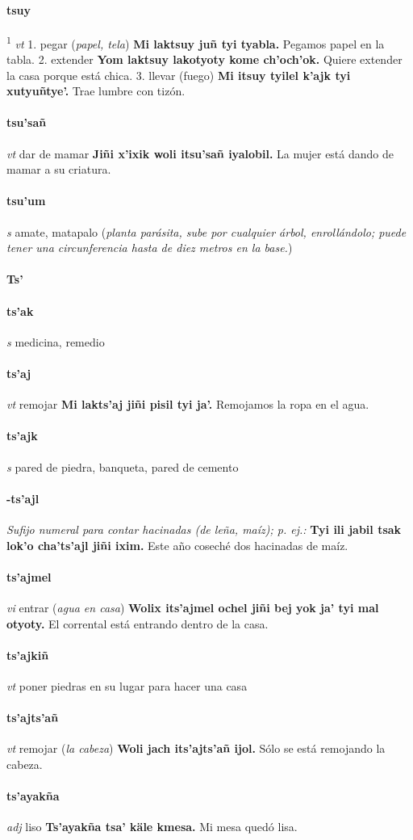 \documentclass{scrbook}
\newcommand{\entry}[1]{\paragraph{#1}}
\newcommand{\alphaletter}[1]{\addsec{#1}}
\newcommand{\onedefinition}[1]{#1.}
\newcommand{\defsuperscript}[1]{\textsuperscript{1}}
\newcommand{\nontranslationdef}[1]{\textit{#1}}
\newcommand{\partofspeech}[1]{\textit{#1}}
\newcommand{\spanishtranslation}[1]{#1}
\newcommand{\clarification}[1]{(\textit{#1})}
\newcommand{\cholexample}[1]{\textbf{#1}}
\newcommand{\exampletranslation}[1]{#1}
\begin{document}
\begin{multicols}{2}
\entry{tsuy}
\defsuperscript{2}
\partofspeech{vt}
\onedefinition{1}
\spanishtranslation{pegar}
\clarification{papel, tela}
\cholexample{Mi laktsuy juñ tyi tyabla.}
\exampletranslation{Pegamos papel en la tabla.}
\onedefinition{2}
\spanishtranslation{extender}
\cholexample{Yom laktsuy lakotyoty kome ch'och'ok.}
\exampletranslation{Quiere extender la casa porque está chica.}
\onedefinition{3}
\spanishtranslation{llevar (fuego)}
\cholexample{Mi itsuy tyilel k'ajk tyi xutyuñtye'.}
\exampletranslation{Trae lumbre con tizón.}

\entry{tsu'sañ}
\partofspeech{vt}
\spanishtranslation{dar de mamar}
\cholexample{Jiñi x'ixik woli itsu'sañ iyalobil.}
\exampletranslation{La mujer está dando de mamar a su criatura.}

\entry{tsu'um}
\partofspeech{s}
\spanishtranslation{amate, matapalo}
\clarification{planta parásita, sube por cualquier árbol, enrollándolo; puede tener una circunferencia hasta de diez metros en la base.}

\entry{Ts'}
\alphaletter{Ts'}

\entry{ts'ak}
\partofspeech{s}
\spanishtranslation{medicina, remedio}

\entry{ts'aj}
\partofspeech{vt}
\spanishtranslation{remojar}
\cholexample{Mi lakts'aj jiñi pisil tyi ja'.}
\exampletranslation{Remojamos la ropa en el agua.}

\entry{ts'ajk}
\partofspeech{s}
\spanishtranslation{pared de piedra, banqueta, pared de cemento}

\entry{-ts'ajl}
\nontranslationdef{Sufijo numeral para contar hacinadas (de leña, maíz); p. ej.:}
\cholexample{Tyi ili jabil tsak lok'o cha'ts'ajl jiñi ixim.}
\exampletranslation{Este año coseché dos hacinadas de maíz.}

\entry{ts'ajmel}
\partofspeech{vi}
\spanishtranslation{entrar}
\clarification{agua en casa}
\cholexample{Wolix its'ajmel ochel jiñi bej yok ja' tyi mal otyoty.}
\exampletranslation{El corrental está entrando dentro de la casa.}

\entry{ts'ajkiñ}
\partofspeech{vt}
\spanishtranslation{poner piedras en su lugar para hacer una casa}

\entry{ts'ajts'añ}
\partofspeech{vt}
\spanishtranslation{remojar}
\clarification{la cabeza}
\cholexample{Woli jach its'ajts'añ ijol.}
\exampletranslation{Sólo se está remojando la cabeza.}

\entry{ts'ayakña}
\partofspeech{adj}
\spanishtranslation{liso}
\cholexample{Ts'ayakña tsa' käle kmesa.}
\exampletranslation{Mi mesa quedó lisa.}


\end{multicols}
\end{document}
